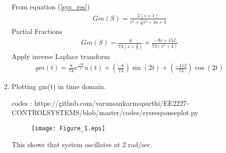 \begin{enumerate}[label=\thesection.\arabic*.,ref=\thesection.\theenumi]
\solution
From equation (\ref{sys_res})
\begin{align}
 Gm(S) = \frac{2(s+1)}{s^3+\frac{3}{4}s^2+4s+3} 
\end{align}
Partial Fractions
\begin{align}
 Gm(S) = \frac{8}{73(s+\frac{3}{4})}+ \frac{-8s+152}{73(s^2+4)}
\end{align}
Apply inverse Laplace transform
\begin{align}
 gm(t) = \frac{8}{73}e^{\frac{-3t}{4}}u(t)+ (\frac{-8}{73})\sin(2t) +(\frac{-152}{73})\cos(2t)
\end{align}



\item Plotting gm(t) in time domain.

codes : https://github.com/varunsankarmoparthi/EE2227-CONTROLSYSTEMS/blob/master/codes/sysresponseplot.py
\begin{figure}[!h]
  \texttt{[image: Figure\_1.eps]}
 
\end{figure}

This shows that system oscillates at 2 rad/sec.
\end{enumerate}
